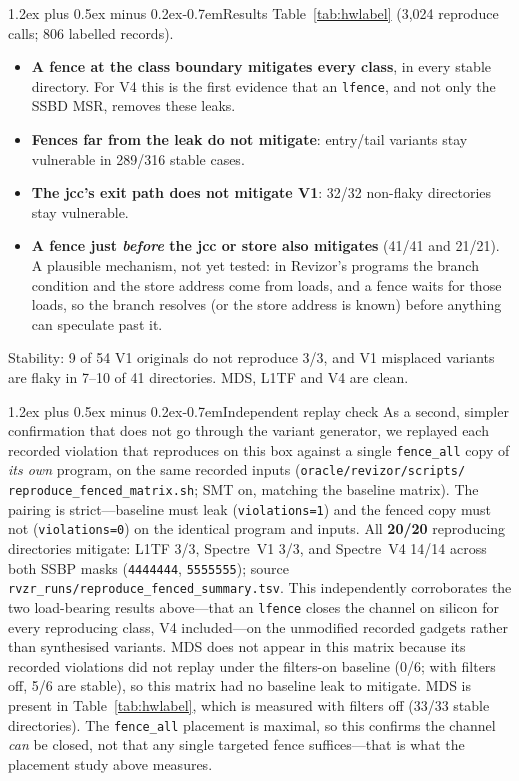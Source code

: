 \documentclass[conference]{IEEEtran}
\makeatletter
\renewcommand\paragraph{\@startsection{paragraph}{4}{\z@}%
  {1.2ex plus 0.5ex minus 0.2ex}{-0.7em}{\normalfont\normalsize\bfseries}}
\makeatother
\begin{document}
\paragraph{Results}
Table~\ref{tab:hwlabel} (3,024 reproduce calls; 806 labelled records).
\begin{itemize}[itemsep=1pt,leftmargin=1.2em]
  \item \textbf{A fence at the class boundary mitigates every class}, in every
    stable directory. For V4 this is the first evidence that an \texttt{lfence}, and
    not only the SSBD MSR, removes these leaks.
  \item \textbf{Fences far from the leak do not mitigate}: entry/tail
    variants stay vulnerable in 289/316 stable cases.
  \item \textbf{The jcc's exit path does not mitigate V1}: 32/32 non-flaky
    directories stay vulnerable.
  \item \textbf{A fence just \emph{before} the jcc or store also mitigates}
    (41/41 and 21/21). A plausible mechanism, not yet tested: in Revizor's
    programs the branch condition and the store address come from loads, and
    a fence waits for those loads, so the branch resolves (or the store
    address is known) before anything can speculate past it.
\end{itemize}
Stability: 9 of 54 V1 originals do not reproduce 3/3, and V1 misplaced
variants are flaky in 7--10 of 41 directories. MDS, L1TF and V4 are clean.

\paragraph{Independent replay check}
As a second, simpler confirmation that does not go through the variant
generator, we replayed each recorded violation that reproduces on this box
against a single \texttt{fence\_all} copy of \emph{its own} program, on the
same recorded inputs (\texttt{oracle/revizor/scripts/\allowbreak
reproduce\_fenced\_matrix.sh}; SMT on, matching the baseline matrix). The
pairing is strict---baseline must leak (\texttt{violations=1}) and the fenced
copy must not (\texttt{violations=0}) on the identical program and inputs. All
\textbf{20/20} reproducing directories mitigate: L1TF 3/3, Spectre~V1 3/3, and
Spectre~V4 14/14 across both SSBP masks (\texttt{4444444}, \texttt{5555555});
source \texttt{rvzr\_runs/reproduce\_fenced\_summary.tsv}. This independently
corroborates the two load-bearing results above---that an \texttt{lfence}
closes the channel on silicon for every reproducing class, V4 included---on the
unmodified recorded gadgets rather than synthesised variants. MDS does not
appear in this matrix because its recorded violations did not replay under
the filters-on baseline (0/6; with filters off, 5/6 are stable), so this
matrix had no baseline leak to mitigate. MDS is present in
Table~\ref{tab:hwlabel}, which is measured with filters off (33/33 stable
directories). The \texttt{fence\_all} placement is maximal, so
this confirms the channel \emph{can} be closed, not that any single targeted
fence suffices---that is what the placement study above measures.
\end{document}
